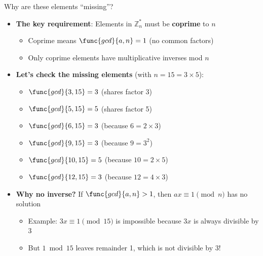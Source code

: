 \documentclass[aspectratio=169, lualatex, handout]{beamer}
\begin{document}
\begin{frame}{Why are these elements ``missing''?}
	\begin{itemize}[<+->]
		\item \textbf{The key requirement}: Elements in $\mathbb{Z}_n^*$ must be \textbf{coprime} to $n$
		      \begin{itemize}
			      \item Coprime means $\func{gcd}{a, n} = 1$ (no common factors)
			      \item Only coprime elements have multiplicative inverses mod $n$
		      \end{itemize}
		\item \textbf{Let's check the missing elements} (with $n = 15 = 3 \times 5$):
		      \begin{itemize}
			      \item $\func{gcd}{3, 15} = 3$ (shares factor 3)
			      \item $\func{gcd}{5, 15} = 5$ (shares factor 5)
			      \item $\func{gcd}{6, 15} = 3$ (because $6 = 2 \times 3$)
			      \item $\func{gcd}{9, 15} = 3$ (because $9 = 3^2$)
			      \item $\func{gcd}{10, 15} = 5$ (because $10 = 2 \times 5$)
			      \item $\func{gcd}{12, 15} = 3$ (because $12 = 4 \times 3$)
		      \end{itemize}
		\item \textbf{Why no inverse?} If $\func{gcd}{a, n} > 1$, then $ax \equiv 1 \pmod{n}$ has no solution
		      \begin{itemize}
			      \item Example: $3x \equiv 1 \pmod{15}$ is impossible because $3x$ is always divisible by 3
			      \item But $1 \bmod 15$ leaves remainder 1, which is not divisible by 3!
		      \end{itemize}
	\end{itemize}
\end{frame}
\end{document}
